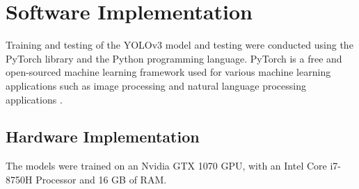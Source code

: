 \section{Software Implementation}
Training and testing of the YOLOv3 model and testing were conducted using the PyTorch library and the Python programming language. PyTorch is a free and open-sourced machine learning framework used for various machine learning applications such as image processing and natural language processing applications \cite{WhatPyTorch}.

\subsection{Hardware Implementation}
The models were trained on an Nvidia GTX 1070 GPU, with an Intel Core i7-8750H Processor and 16 GB of RAM.